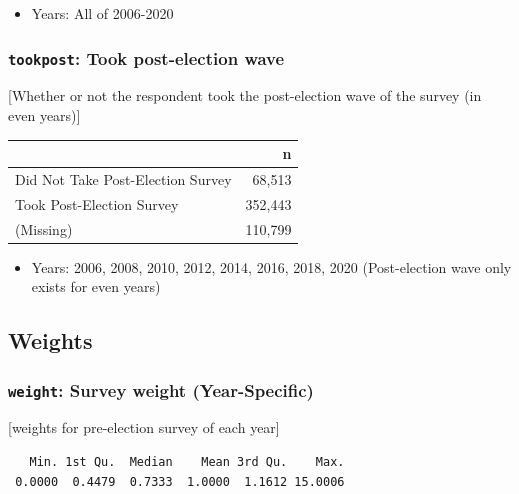 \documentclass[10pt,article,oneside]{memoir}
\theoremstyle{definition}
\begin{document}
\begin{itemize}
\tightlist
\item
  Years: All of 2006-2020
\end{itemize}

\hypertarget{tookpost-took-post-election-wave}{%
\subsubsection{\texorpdfstring{\texttt{tookpost}: Took post-election
wave}{tookpost: Took post-election wave}}\label{tookpost-took-post-election-wave}}

{[}Whether or not the respondent took the post-election wave of the
survey (in even years){]}

\begin{table}[H]
\centering
\begin{tabular}[t]{lr}
\toprule
 & n\\
\midrule
Did Not Take Post-Election Survey & 68,513\\
Took Post-Election Survey & 352,443\\
(Missing) & 110,799\\
\bottomrule
\end{tabular}
\end{table}

\begin{itemize}
\tightlist
\item
  Years: 2006, 2008, 2010, 2012, 2014, 2016, 2018, 2020 (Post-election
  wave only exists for even years)
\end{itemize}

\hypertarget{weights}{%
\subsection{Weights}\label{weights}}

\hypertarget{weight-survey-weight-year-specific}{%
\subsubsection{\texorpdfstring{\texttt{weight}: Survey weight
(Year-Specific)}{weight: Survey weight (Year-Specific)}}\label{weight-survey-weight-year-specific}}

{[}weights for pre-election survey of each year{]}

\begin{verbatim}
   Min. 1st Qu.  Median    Mean 3rd Qu.    Max. 
 0.0000  0.4479  0.7333  1.0000  1.1612 15.0006 
\end{verbatim}
\end{document}
